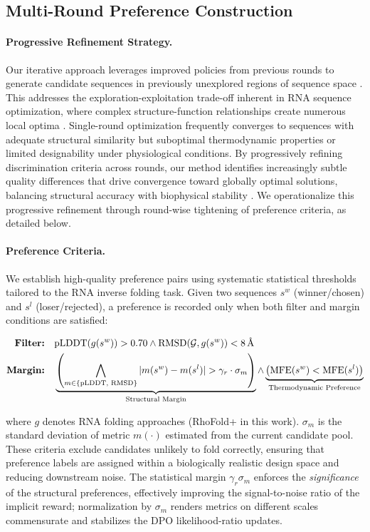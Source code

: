 \subsection{Multi-Round Preference Construction}

\paragraph{Progressive Refinement Strategy.}
Our iterative approach leverages improved policies from previous rounds to generate candidate sequences in previously unexplored regions of sequence space \citep{belanger2019biological}. This addresses the exploration-exploitation trade-off inherent in RNA sequence optimization, where complex structure-function relationships create numerous local optima \citep{hofacker2010barmap,jimenez2013comprehensive}. Single-round optimization frequently converges to sequences with adequate structural similarity but suboptimal thermodynamic properties or limited designability under physiological conditions. By progressively refining discrimination criteria across rounds, our method identifies increasingly subtle quality differences that drive convergence toward globally optimal solutions, balancing structural accuracy with biophysical stability \citep{gonzalez2017preferential}. 
We operationalize this progressive refinement through round-wise tightening of preference criteria, as detailed below.

\paragraph{Preference Criteria.}
We establish high-quality preference pairs using systematic statistical thresholds tailored to the RNA inverse folding task. Given two sequences $s^w$ (winner/chosen) and $s^l$ (loser/rejected), a preference is recorded only when both filter and margin conditions are satisfied:

\begin{align}
\text{\textbf{Filter:}} \quad & \text{pLDDT}(g(s^w)) > 0.70 \land \text{RMSD}(\mathcal{G}, g(s^w)) < 8\,\text{\AA} \\
\text{\textbf{Margin:}} \quad & \underbrace{\left(\bigwedge_{m\in\{\text{pLDDT, RMSD}\}}|m(s^w)-m(s^l)|>\gamma_r\cdot\sigma_m\right)}_{\text{Structural Margin}} \land \underbrace{\left(\text{MFE}(s^w) < \text{MFE}(s^l)\right)}_{\text{Thermodynamic Preference}}
\end{align}


where $g$ denotes RNA folding approaches (RhoFold+ \citep{shen2024accurate} in this work). $\sigma_m$ is the standard deviation of metric $m(\cdot)$ estimated from the current candidate pool. These criteria exclude candidates unlikely to fold correctly, ensuring that preference labels are assigned within a biologically realistic design space and reducing downstream noise. The statistical margin $\gamma_r\sigma_m$ enforces the \emph{significance} of the structural preferences, effectively improving the signal-to-noise ratio of the implicit reward; normalization by $\sigma_m$ renders metrics on different scales commensurate and stabilizes the DPO likelihood-ratio updates. 



